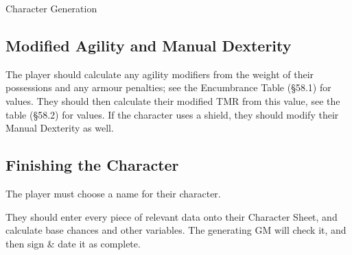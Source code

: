 \begin{Chapter}{Character Generation}
\subsection{Modified Agility and Manual Dexterity}

The player should calculate any agility modifiers from the weight of
their possessions and any armour penalties; see the Encumbrance Table
(\S58.1) for values.  They should then calculate their modified TMR
from this value, see the table (\S58.2) for values.  If the character
uses a shield, they should modify their Manual Dexterity as well.

\subsection{Finishing the Character}

The player must choose a name for their character. 

They should enter every piece of relevant data onto their Character
Sheet, and calculate base chances and other variables. The generating
GM will check it, and then sign \& date it as complete.

\end{Chapter}

